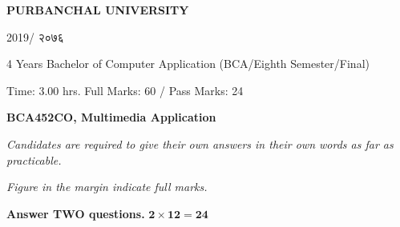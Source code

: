 \documentclass[a4paper, twoside, 12pt, noanswers]{exam}
\newcommand{\textnp}{\texthindi}
\begin{document}

\begin{framed}
	\raggedright{\bfseries\Large\centering PURBANCHAL UNIVERSITY \par {2019/ \textnp{२०७६}}\par}
	{ 4 Years Bachelor of Computer Application (BCA/Eighth Semester/Final)\par}
	{ Time: 3.00 hrs.  \hfill Full Marks: 60 / Pass Marks: 24\par}
	{\bfseries {BCA452CO, Multimedia Application \hfill}\par}
\end{framed}

{\noindent \it{Candidates are required to give their own answers in their own words as far as practicable.  }\par}
{\noindent \it{Figure in the margin indicate full marks.}\par}

{}
{\hspace*{-0.5cm} \bfseries Answer TWO questions.} \hfill {\( \mathbf{2\times 12 =24}\)}
\end{document}

